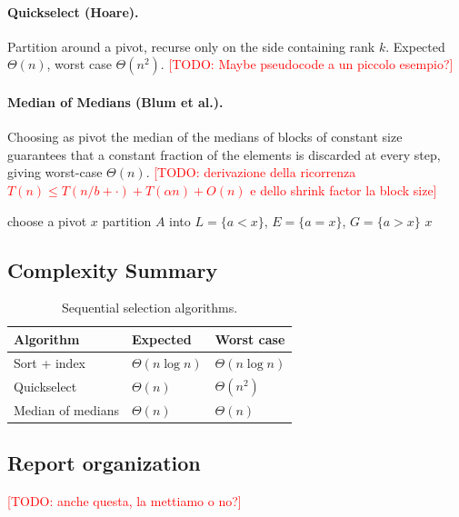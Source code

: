 \documentclass[11pt, titlepage]{article}
\newcommand{\TODO}[1]{\textcolor{red}{[TODO: #1]}}
\begin{document}
\paragraph{Quickselect (Hoare).}
Partition around a pivot, recurse only on the side containing rank $k$. Expected $\Theta(n)$, worst case $\Theta(n^2)$.
\TODO{Maybe pseudocode a un piccolo esempio?}

\paragraph{Median of Medians (Blum et al.).}
Choosing as pivot the median of the medians of blocks of constant size guarantees that a constant fraction of the elements is discarded at every step, giving worst-case $\Theta(n)$.
\TODO{derivazione della ricorrenza $T(n)\le T(n/b + \cdot)+T(\alpha n)+O(n)$ e dello shrink factor la block size}

\begin{algorithm}[t]
  \caption{Sequential selection (quickselect, 0-based rank $k$)}\label{alg:qselect}
  \begin{algorithmic}[1]
    \State choose a pivot $x$ 
    \State partition $A$ into $L=\{a<x\}$, $E=\{a=x\}$, $G=\{a>x\}$
     \Return {}
     \Return $x$
    \Else{} \Return {}
    \EndIf
    \EndFunction
  \end{algorithmic}
\end{algorithm}

\subsection{Complexity Summary}
\begin{table}[h]
  \centering
  \begin{tabular}{lll}
    \toprule
    Algorithm & Expected & Worst case\\
    \midrule
    Sort + index & $\Theta(n\log n)$ & $\Theta(n\log n)$\\
    Quickselect & $\Theta(n)$ & $\Theta(n^2)$\\
    Median of medians & $\Theta(n)$ & $\Theta(n)$\\
    \bottomrule	
  \end{tabular}
  \caption{Sequential selection algorithms.}
\end{table}

\subsection{Report organization}
\TODO{anche questa, la mettiamo o no?}
\end{document}
